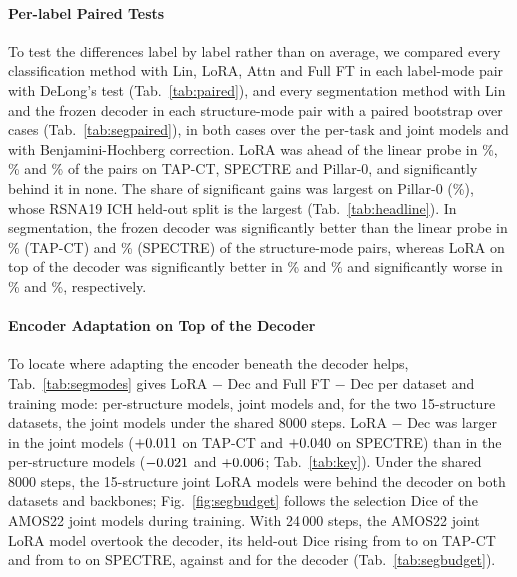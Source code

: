 \paragraph{Per-label Paired Tests} To test the differences label by label rather than on average, we compared every classification method with Lin, LoRA, Attn and Full FT in each label-mode pair with DeLong's test (Tab.~\ref{tab:paired}), and every segmentation method with Lin and the frozen decoder in each structure-mode pair with a paired bootstrap over cases (Tab.~\ref{tab:segpaired}), in both cases over the per-task and joint models and with Benjamini-Hochberg correction. LoRA was ahead of the linear probe in \numPairedTapctLinLoraBetter\%, \numPairedSpectreLinLoraBetter\% and \numPairedPillarZLinLoraBetter\% of the pairs on TAP-CT, SPECTRE and Pillar-0, and significantly behind it in none. The share of significant gains was largest on Pillar-0 (\numPairedPillarZLinLoraSigbetter\%), whose RSNA19 ICH held-out split is the largest (Tab.~\ref{tab:headline}). In segmentation, the frozen decoder was significantly better than the linear probe in \numSegpairedTapctLinDecSigbetter\% (TAP-CT) and \numSegpairedSpectreLinDecSigbetter\% (SPECTRE) of the structure-mode pairs, whereas LoRA on top of the decoder was significantly better in \numSegpairedTapctDecLoraSigbetter\% and \numSegpairedSpectreDecLoraSigbetter\% and significantly worse in \numSegpairedTapctDecLoraSigworse\% and \numSegpairedSpectreDecLoraSigworse\%, respectively.

\paragraph{Encoder Adaptation on Top of the Decoder} To locate where adapting the encoder beneath the decoder helps, Tab.~\ref{tab:segmodes} gives LoRA $-$ Dec and Full FT $-$ Dec per dataset and training mode: per-structure models, joint models and, for the two 15-structure datasets, the joint models under the shared 8000 steps. LoRA $-$ Dec was larger in the joint models ($+0.011$ on TAP-CT and $+0.040$ on SPECTRE) than in the per-structure models ($-0.021$ and $+0.006$; Tab.~\ref{tab:key}). Under the shared 8000 steps, the 15-structure joint LoRA models were behind the decoder on both datasets and backbones; Fig.~\ref{fig:segbudget} follows the selection Dice of the AMOS22 joint models during training. With 24\,000 steps, the AMOS22 joint LoRA model overtook the decoder, its held-out Dice rising from \numSegbudgetAmosBBTapctJointHKLora{} to \numSegbudgetAmosBBTapctJointLora{} on TAP-CT and from \numSegbudgetAmosBBSpectreJointHKLora{} to \numSegbudgetAmosBBSpectreJointLora{} on SPECTRE, against \numSegbudgetAmosBBTapctJointDec{} and \numSegbudgetAmosBBSpectreJointDec{} for the decoder (Tab.~\ref{tab:segbudget}).

